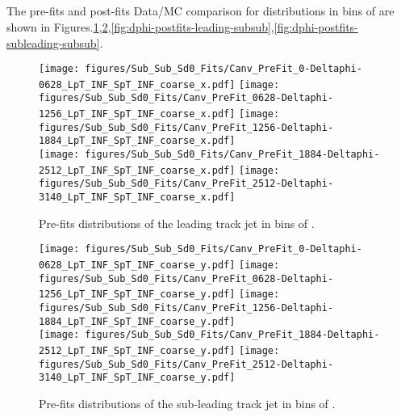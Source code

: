 \clearpage
\subsection{\dphi}

The pre-fits and post-fits Data/MC comparison for \subsubsdzero distributions in bins of \dphi are shown in Figures.\ref{fig:dphi-prefits-leading-subsub},\ref{fig:dphi-prefits-subleading-subsub},\ref{fig:dphi-postfits-leading-subsub},\ref{fig:dphi-postfits-subleading-subsub}.

\begin{figure}[htbp]
  \centering
 \texttt{[image: figures/Sub\_Sub\_Sd0\_Fits/Canv\_PreFit\_0-Deltaphi-0628\_LpT\_INF\_SpT\_INF\_coarse\_x.pdf]}
 \texttt{[image: figures/Sub\_Sub\_Sd0\_Fits/Canv\_PreFit\_0628-Deltaphi-1256\_LpT\_INF\_SpT\_INF\_coarse\_x.pdf]}
 \texttt{[image: figures/Sub\_Sub\_Sd0\_Fits/Canv\_PreFit\_1256-Deltaphi-1884\_LpT\_INF\_SpT\_INF\_coarse\_x.pdf]}\\
 \texttt{[image: figures/Sub\_Sub\_Sd0\_Fits/Canv\_PreFit\_1884-Deltaphi-2512\_LpT\_INF\_SpT\_INF\_coarse\_x.pdf]}
 \texttt{[image: figures/Sub\_Sub\_Sd0\_Fits/Canv\_PreFit\_2512-Deltaphi-3140\_LpT\_INF\_SpT\_INF\_coarse\_x.pdf]}
\caption{Pre-fits \subsdzero distributions of the leading track jet in bins of \dphi. }
  \label{fig:dphi-prefits-leading-subsub}
\end{figure}


\begin{figure}[htbp]
  \centering
 \texttt{[image: figures/Sub\_Sub\_Sd0\_Fits/Canv\_PreFit\_0-Deltaphi-0628\_LpT\_INF\_SpT\_INF\_coarse\_y.pdf]}
 \texttt{[image: figures/Sub\_Sub\_Sd0\_Fits/Canv\_PreFit\_0628-Deltaphi-1256\_LpT\_INF\_SpT\_INF\_coarse\_y.pdf]}
 \texttt{[image: figures/Sub\_Sub\_Sd0\_Fits/Canv\_PreFit\_1256-Deltaphi-1884\_LpT\_INF\_SpT\_INF\_coarse\_y.pdf]}\\
 \texttt{[image: figures/Sub\_Sub\_Sd0\_Fits/Canv\_PreFit\_1884-Deltaphi-2512\_LpT\_INF\_SpT\_INF\_coarse\_y.pdf]}
 \texttt{[image: figures/Sub\_Sub\_Sd0\_Fits/Canv\_PreFit\_2512-Deltaphi-3140\_LpT\_INF\_SpT\_INF\_coarse\_y.pdf]}

\caption{Pre-fits \subsdzero distributions of the sub-leading track jet in bins of \dphi. }
  \label{fig:dphi-prefits-subleading-subsub}
\end{figure}

